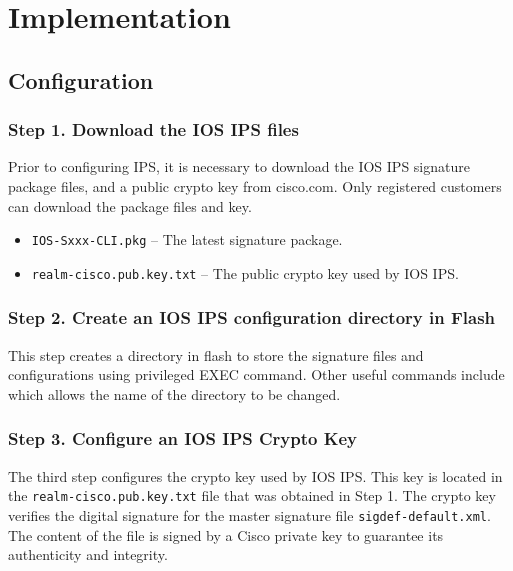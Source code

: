 \section{Implementation}

\subsection{Configuration}

\subsubsection{Step 1. Download the IOS IPS files}

Prior to configuring IPS, it is necessary to download the IOS IPS signature package files, and a public crypto key from cisco.com. Only registered customers can download the package files and key.

\begin{itemize}
\item \verb|IOS-Sxxx-CLI.pkg| -- The latest signature package.
\item \verb|realm-cisco.pub.key.txt| -- The public crypto key used by IOS IPS.
\end{itemize}

\subsubsection{Step 2. Create an IOS IPS configuration directory in Flash}

This step creates a directory in flash to store the signature files and configurations using  privileged EXEC command. Other useful commands include  which allows the name of the directory to be changed. 

\subsubsection{Step 3. Configure an IOS IPS Crypto Key}

The third step configures the crypto key used by IOS IPS. This key is located in the \verb|realm-cisco.pub.key.txt| file that was obtained in Step 1. The crypto key verifies the digital signature for the master signature file \verb|sigdef-default.xml|. The content of the file is signed by a Cisco private key to guarantee its authenticity and integrity.\\

